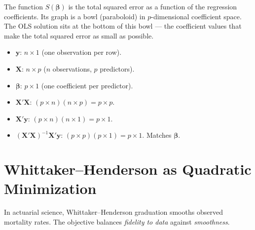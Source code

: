 \documentclass[11pt,a4paper]{article}
\begin{document}
\begin{intuition}
The function $S(\bm{\beta})$ is the total squared error as a function of the regression coefficients. Its graph is a bowl (paraboloid) in $p$-dimensional coefficient space. The OLS solution sits at the bottom of this bowl --- the coefficient values that make the total squared error as small as possible.
\end{intuition}

\begin{dimcheck}
\begin{itemize}[nosep]
\item $\bm{y}$: $n \times 1$ (one observation per row).
\item $\bm{X}$: $n \times p$ ($n$ observations, $p$ predictors).
\item $\bm{\beta}$: $p \times 1$ (one coefficient per predictor).
\item $\bm{X}'\bm{X}$: $(p \times n)(n \times p) = p \times p$.
\item $\bm{X}'\bm{y}$: $(p \times n)(n \times 1) = p \times 1$.
\item $(\bm{X}'\bm{X})^{-1}\bm{X}'\bm{y}$: $(p \times p)(p \times 1) = p \times 1$. Matches $\bm{\beta}$.
\end{itemize}
\end{dimcheck}

\section{Whittaker--Henderson as Quadratic Minimization}

In actuarial science, Whittaker--Henderson graduation smooths observed mortality rates. The objective balances \emph{fidelity to data} against \emph{smoothness}.
\end{document}
